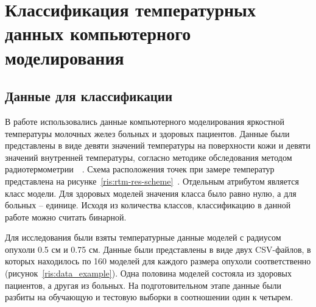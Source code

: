 \newpage
\section{\Large Классификация температурных данных компьютерного моделирования}\vspace{-7mm}
\subsection{Данные для классификации}
В работе использовались данные компьютерного моделирования яркостной температуры молочных желез больных и здоровых пациентов. Данные были представлены в виде девяти значений температуры на поверхности кожи и девяти значений внутренней температуры, согласно методике обследования методом радиотермометрии~\cite{fear2000}~\cite{bardati}. Схема расположения точек при замере температур представлена на рисунке~\ref{ris:rtm-res-scheme}~\cite{vesninSovMicrowave}. Отдельным атрибутом является класс модели. Для здоровых моделей значения класса было равно нулю, а для больных -- единице. Исходя из количества классов, классификацию в данной работе можно считать бинарной.
\\
\par
Для исследования были взяты температурные данные моделей с радиусом опухоли 0.5 см и 0.75 см. Данные были представлены в виде двух CSV-файлов, в которых находилось по 160 моделей для каждого размера опухоли соответственно (рисунок~\ref{ris:data_example}). Одна половина моделей состояла из здоровых пациентов, а другая из больных. На подготовительном этапе данные были разбиты на обучающую и тестовую выборки в соотношении один к четырем.
\\


